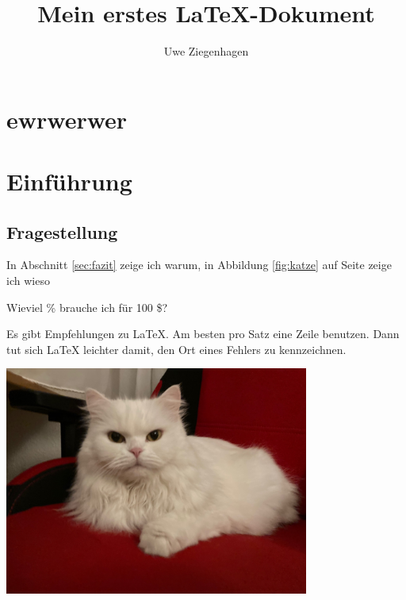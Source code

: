 \documentclass[12pt,parskip=half]{scrartcl}
\author{Uwe Ziegenhagen}
\title{Mein erstes \LaTeX-Dokument}
\begin{document}
\maketitle

\tableofcontents %

\listoffigures

\listoftables

\listoftodos

\clearpage

\section{ewrwerwer}

\section{Einführung}
\subsection{Fragestellung} 

In Abschnitt \ref{sec:fazit} zeige ich warum, in Abbildung \ref{fig:katze} auf Seite \pageref{fig:katze} zeige ich wieso

Wieviel \% brauche ich für 100 \$? %

Es gibt Empfehlungen zu LaTeX.
Am besten pro Satz eine Zeile benutzen.
Dann tut sich LaTeX leichter damit, den Ort eines Fehlers zu kennzeichnen.

\includegraphics[width=0.75\textwidth]{Bilder/Katze}
\end{document}
